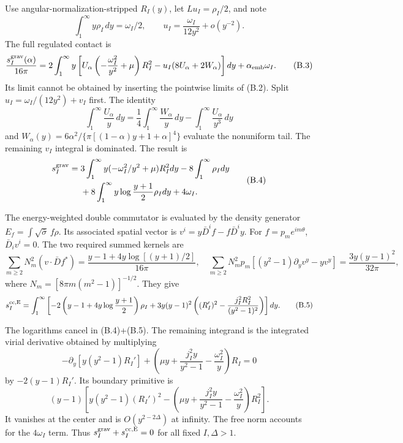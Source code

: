 Use angular-normalization-stripped \(R_I(y)\), let \(Lu_I=\rho_I/2\), and note \[
\int_1^\infty y\rho_I\,dy=\omega_I/2,\qquad
u_I=\frac{\omega_I}{12y^2}+o(y^{-2}).
\] The full regulated contact is \[
\frac{s_I^{\rm grav}(\alpha)}{16\pi}
=2\int_1^\infty y
\left[U_\alpha\left(-\frac{\omega_I^2}{y^2}+\mu\right)R_I^2
-u_I(8U_\alpha+2W_\alpha)\right]dy
+\alpha_{\rm emb}\omega_I .
\tag{B.3}
\] Its limit cannot be obtained by inserting the pointwise limits of (B.2). Split \(u_I=\omega_I/(12y^2)+v_I\) first. The identity \[
\int_1^\infty\frac{U_\alpha}{y}\,dy
=\frac14\int_1^\infty\frac{W_\alpha}{y}\,dy
-\int_1^\infty\frac{U_\alpha}{y^3}\,dy
\] and \(W_\alpha(y)=6\alpha^2/\{\pi[(1-\alpha)y+1+\alpha]^4\}\) evaluate the nonuniform tail. The remaining \(v_I\) integral is dominated. The result is \[
\begin{aligned}
s_I^{\rm grav}={}&
3\int_1^\infty y(-\omega_I^2/y^2+\mu)R_I^2dy
-8\int_1^\infty\rho_Idy\\
&+8\int_1^\infty y\log\frac{y+1}{2}\rho_Idy+4\omega_I.
\end{aligned}
\tag{B.4}
\]

The energy-weighted double commutator is evaluated by the density generator \(E_f=\int\sqrt{\bar\sigma}\,f\rho\). Its associated spatial vector is \(v^i=y\bar D^if-f\bar D^iy\). For \(f=p_me^{im\theta}\), \(\bar D_iv^i=0\). The two required summed kernels are \[
\sum_{m\ge2}N_m^2(v\cdot\bar Df^*)
=\frac{y-1+4y\log[(y+1)/2]}{16\pi},
\quad
\sum_{m\ge2}N_m^2p_m[(y^2-1)\partial_yv^y-yv^y]
=\frac{3y(y-1)^2}{32\pi},
\] where \(N_m=[8\pi m(m^2-1)]^{-1/2}\). They give \[
\begin{aligned}
s_I^{\rm cc,E}
=\int_1^\infty\left[
-2\left(y-1+4y\log\frac{y+1}{2}\right)\rho_I
+3y(y-1)^2
\left((R_I')^2-\frac{j_I^2R_I^2}{(y^2-1)^2}\right)
\right]dy .
\end{aligned}
\tag{B.5}
\]

The logarithms cancel in (B.4)+(B.5). The remaining integrand is the integrated virial derivative obtained by multiplying \[
-\partial_y[y(y^2-1)R_I']
+\left(\mu y+\frac{j_I^2y}{y^2-1}
-\frac{\omega_I^2}{y}\right)R_I=0
\] by \(-2(y-1)R_I'\). Its boundary primitive is \[
(y-1)\left[
y(y^2-1)(R_I')^2
-\left(\mu y+\frac{j_I^2y}{y^2-1}
-\frac{\omega_I^2}{y}\right)R_I^2
\right].
\tag{B.6}
\] It vanishes at the center and is \(O(y^{2-2\Delta})\) at infinity. The free norm accounts for the \(4\omega_I\) term. Thus \(s_I^{\rm grav}+s_I^{\rm cc,E}=0\) for all fixed \(I,\Delta>1\).

